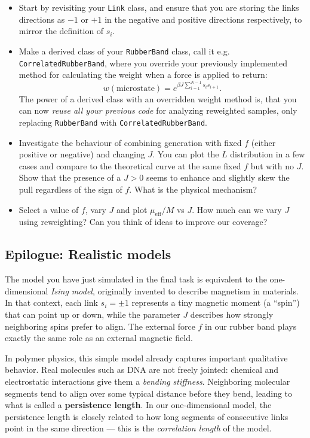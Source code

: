 \documentclass[11pt]{article}
\begin{document}
\begin{itemize}
  \item Start by revisiting your \texttt{Link} class, and ensure that you are storing the links directions as $-1$ or $+1$ in the negative and positive directions respectively, to mirror the definition of $s_i$.
  \item Make a derived class of your \texttt{RubberBand} class, call it e.g. \texttt{CorrelatedRubberBand}, where you override your previously implemented method for calculating the weight when a force is applied to return:
  \[w(\text{microstate}) = e^{\beta J\sum^{N-1}_{i=1}s_i s_{i+1}}.\]
  The power of a derived class with an overridden weight method is, that you can now \textit{reuse all your previous code} for analyzing reweighted samples, only replacing \texttt{RubberBand} with \texttt{CorrelatedRubberBand}.
  \item Investigate the behaviour of combining generation with fixed $f$ (either positive or negative) and changing $J$. You can plot the $L$ distribution in a few cases and compare to the theoretical curve at the same fixed $f$ but with no $J$. Show that the presence of a $J>0$ seems to enhance and slightly skew the pull regardless of the sign of $f$. What is the physical mechanism?
  \item Select a value of $f$, vary $J$ and plot $\mu_\text{eff}/M$ vs $J$. How much can we vary $J$ using reweighting? Can you think of ideas to improve our coverage?
\end{itemize}

\subsection*{Epilogue: Realistic models}
The model you have just simulated in the final task is equivalent to
the one-dimensional \textit{Ising model}, originally invented to describe magnetism in materials. In that context, each link 
$s_i = \pm 1$ represents a tiny magnetic moment (a ``spin'') that can
 point up or down, while the parameter $J$ describes how strongly
  neighboring spins prefer to align. The external force $f$ in our 
  rubber band plays exactly the same role as an external magnetic field.

In polymer physics, this simple model already captures important qualitative behavior. 
Real molecules such as DNA are not freely jointed: chemical and electrostatic interactions 
give them a \textit{bending stiffness}. Neighboring molecular segments tend to align over 
some typical distance before they bend, leading to what is called a \textbf{persistence length}. 
In our one-dimensional model, the persistence length is closely related to how long segments of 
consecutive links point in the same direction — this is the \textit{correlation length} of the model.
\end{document}
